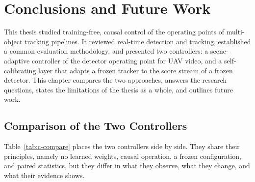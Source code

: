 \chapter{Conclusions and Future Work}\label{ch:conclusions}

This thesis studied training-free, causal control of the operating points of multi-object tracking pipelines. It reviewed real-time detection and tracking, established a common evaluation methodology, and presented two controllers: a scene-adaptive controller of the detector operating point for UAV video, and a self-calibrating layer that adapts a frozen tracker to the score stream of a frozen detector. This chapter compares the two approaches, answers the research questions, states the limitations of the thesis as a whole, and outlines future work.

\section{Comparison of the Two Controllers}\label{sec:c-compare}
Table~\ref{tab:c-compare} places the two controllers side by side. They share their principles, namely no learned weights, causal operation, a frozen configuration, and paired statistics, but they differ in what they observe, what they change, and what their evidence shows.

